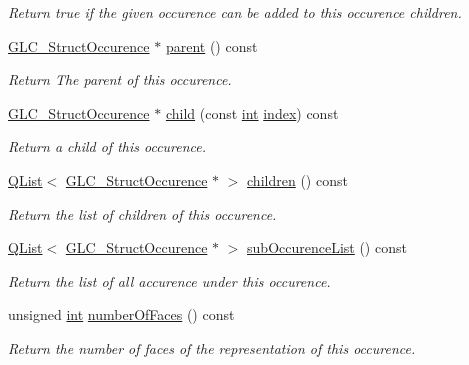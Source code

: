 \begin{DoxyCompactItemize}
\begin{DoxyCompactList}\small\item\em Return true if the given occurence can be added to this occurence children. \end{DoxyCompactList}\item 
\hyperlink{class_g_l_c___struct_occurence}{G\-L\-C\-\_\-\-Struct\-Occurence} $\ast$ \hyperlink{class_g_l_c___struct_occurence_a32071de4bc5dbb8c3bdd0ed13ae3dd08}{parent} () const 
\begin{DoxyCompactList}\small\item\em Return The parent of this occurence. \end{DoxyCompactList}\item 
\hyperlink{class_g_l_c___struct_occurence}{G\-L\-C\-\_\-\-Struct\-Occurence} $\ast$ \hyperlink{class_g_l_c___struct_occurence_a20bb0e839e2573d60c2a61d900917740}{child} (const \hyperlink{ioapi_8h_a787fa3cf048117ba7123753c1e74fcd6}{int} \hyperlink{glext_8h_ab47dd9958bcadea08866b42bf358e95e}{index}) const 
\begin{DoxyCompactList}\small\item\em Return a child of this occurence. \end{DoxyCompactList}\item 
\hyperlink{class_q_list}{Q\-List}$<$ \hyperlink{class_g_l_c___struct_occurence}{G\-L\-C\-\_\-\-Struct\-Occurence} $\ast$ $>$ \hyperlink{class_g_l_c___struct_occurence_a5f337666d091b1323242bcdde6e2b06b}{children} () const 
\begin{DoxyCompactList}\small\item\em Return the list of children of this occurence. \end{DoxyCompactList}\item 
\hyperlink{class_q_list}{Q\-List}$<$ \hyperlink{class_g_l_c___struct_occurence}{G\-L\-C\-\_\-\-Struct\-Occurence} $\ast$ $>$ \hyperlink{class_g_l_c___struct_occurence_a69a05dc5791ea796121fc06f0df4ec72}{sub\-Occurence\-List} () const 
\begin{DoxyCompactList}\small\item\em Return the list of all accurence under this occurence. \end{DoxyCompactList}\item 
unsigned \hyperlink{ioapi_8h_a787fa3cf048117ba7123753c1e74fcd6}{int} \hyperlink{class_g_l_c___struct_occurence_a821c637a83a3d44f1b534f848f2eca15}{number\-Of\-Faces} () const 
\begin{DoxyCompactList}\small\item\em Return the number of faces of the representation of this occurence. \end{DoxyCompactList}\item 

\end{DoxyCompactItemize}
